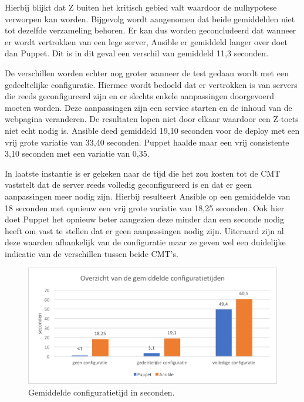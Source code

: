 Hierbij blijkt dat Z buiten het kritisch gebied valt waardoor de nulhypotese verworpen kan worden. Bijgevolg wordt aangenomen dat beide gemiddelden niet tot dezelfde verzameling behoren. Er kan dus worden geconcludeerd dat wanneer er wordt vertrokken van een lege server, Ansible er gemiddeld langer over doet dan Puppet. Dit is in dit geval een verschil van gemiddeld 11,3 seconden. 

De verschillen worden echter nog groter wanneer de test gedaan wordt met een gedeeltelijke configuratie. Hiermee wordt bedoeld dat er vertrokken is van servers die reeds geconfigureerd zijn en er slechts enkele aanpassingen doorgevoerd moeten worden. Deze aanpassingen zijn een service starten en de inhoud van de webpagina veranderen. De resultaten lopen niet door elkaar waardoor een Z-toets niet echt nodig is. Ansible deed gemiddeld 19,10 seconden voor de \gls{deploy} met een vrij grote variatie van 33,40 seconden. Puppet haalde maar een vrij consistente 3,10 seconden met een variatie van 0,35.

In laatste instantie is er gekeken naar de tijd die het zou kosten tot de \gls{CMT} vaststelt dat de server reeds volledig geconfigureerd is en dat er geen aanpassingen meer nodig zijn. Hierbij resulteert Ansible op een gemiddelde van 18 seconden met opnieuw een vrij grote variatie van 18,25 seconden. Ook hier doet Puppet het opnieuw beter aangezien deze minder dan een seconde nodig heeft om vast te stellen dat er geen aanpassingen nodig zijn. Uiteraard zijn al deze waarden afhankelijk van de configuratie maar ze geven wel een duidelijke indicatie van de verschillen tussen beide \gls{CMT}'s.


\begin{figure}
	\includegraphics[width=\linewidth]{img/overzichtgemiddeldeconfigtijd.png} 
	\caption{Gemiddelde configuratietijd in seconden.}  

\end{figure}

